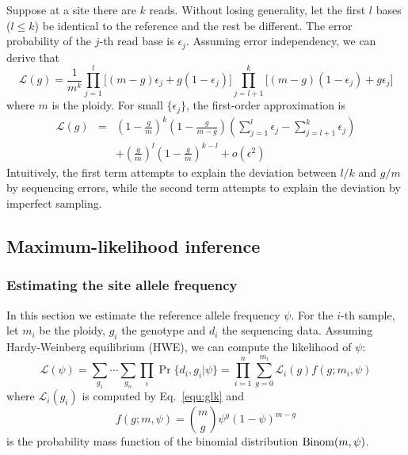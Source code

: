\documentclass{bioinfo}
\begin{document}
\begin{methods}
Suppose at a site there are $k$ reads. Without losing generality, let the first $l$
bases ($l\le k$) be identical to the reference and the rest be
different. The error probability of the $j$-th read base is $\epsilon_j$.
Assuming error independency, we can derive that
\begin{equation}\label{equ:glk}
\mathcal{L}(g)=\frac{1}{m^k}\prod_{j=1}^l\Big[(m-g)\epsilon_j+g(1-\epsilon_j)\Big]\prod_{j=l+1}^k\Big[(m-g)(1-\epsilon_j)+g\epsilon_j\Big]
\end{equation}
where $m$ is the ploidy. For small $\{\epsilon_j\}$, the first-order approximation is
\begin{eqnarray*}
\mathcal{L}(g)&=&\left(1-\frac{g}{m}\right)^k\left(1-\frac{g}{m-g}\right)\left(\sum_{j=1}^l\epsilon_j-\sum_{j=l+1}^k\epsilon_j\right)\\
&&+\left(\frac{g}{m}\right)^l\left(1-\frac{g}{m}\right)^{k-l}+o(\epsilon^2)
\end{eqnarray*}
Intuitively, the first term attempts to explain
the deviation between $l/k$ and $g/m$ by sequencing errors, while
the second term attempts to explain the deviation by imperfect sampling.


\subsection{Maximum-likelihood inference}

\subsubsection{Estimating the site allele frequency}
In this section we estimate the reference allele frequency $\psi$.
For the $i$-th sample, let $m_i$ be the ploidy, $g_i$ 
the genotype and $d_i$ the sequencing data.
Assuming Hardy-Weinberg equilibrium (HWE), we can compute the likelihood of $\psi$:
\begin{equation}\label{equ:flk}
\mathcal{L}(\psi)=\sum_{g_1}\cdots\sum_{g_n}\prod_i\Pr\{d_i,g_i|\psi\}=\prod_{i=1}^n\sum_{g=0}^{m_i}\mathcal{L}_i(g)f(g;m_i,\psi)
\end{equation}
where $\mathcal{L}_i(g_i)$ is computed by Eq.~\eqref{equ:glk} and
\begin{equation}
f(g;m,\psi)=\binom{m}{g}\psi^g(1-\psi)^{m-g}
\end{equation}
is the probability mass function of the binomial distribution ${\rm Binom}(m,\psi)$.


\end{methods}
\end{document}
